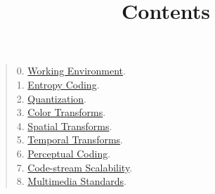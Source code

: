 

\title{\SM{} \newline Contents}

\maketitle

\begin{quote}
0. \href{https://github.com/Sistemas-Multimedia/Sistemas-Multimedia.github.io/tree/master/contents/working_environment}{Working Environment}.\\
1. \href{https://github.com/Sistemas-Multimedia/Sistemas-Multimedia.github.io/tree/master/contents/entropy_coding}{Entropy Coding}. \\
2. \href{https://github.com/Sistemas-Multimedia/Sistemas-Multimedia.github.io/tree/master/contents/quantization}{Quantization}. \\
3. \href{https://github.com/Sistemas-Multimedia/Sistemas-Multimedia.github.io/tree/master/contents/color_transforms}{Color Transforms}. \\
4. \href{https://github.com/Sistemas-Multimedia/Sistemas-Multimedia.github.io/tree/master/contents/spatial_transforms}{Spatial Transforms}. \\
5. \href{https://github.com/Sistemas-Multimedia/Sistemas-Multimedia.github.io/tree/master/contents/temporal_transforms}{Temporal Transforms}. \\
6. \href{https://github.com/Sistemas-Multimedia/Sistemas-Multimedia.github.io/tree/master/contents/perceptual_coding}{Perceptual Coding}. \\
7. \href{https://github.com/Sistemas-Multimedia/Sistemas-Multimedia.github.io/tree/master/contents/data_scalability}{Code-stream Scalability}. \\
8. \href{https://github.com/Sistemas-Multimedia/Sistemas-Multimedia.github.io/tree/master/contents/standards}{Multimedia Standards}.  %
\end{quote}



